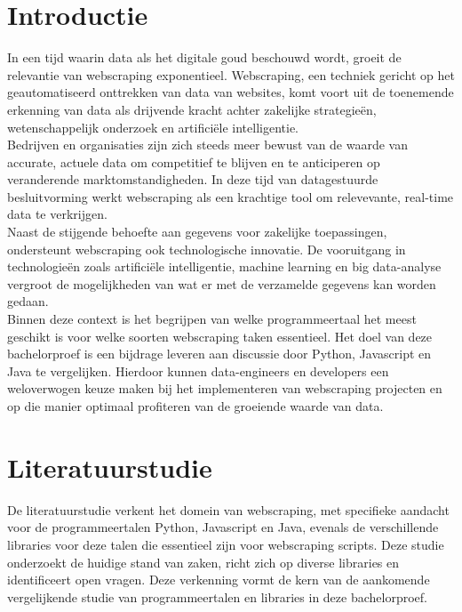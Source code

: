 
\section{Introductie}%
\label{sec:introductie}

In een tijd waarin data als het digitale goud beschouwd wordt, groeit de relevantie van webscraping exponentieel.
Webscraping, een techniek gericht op het geautomatiseerd onttrekken van data van websites, komt voort uit de toenemende 
erkenning van data als drijvende kracht achter zakelijke strategieën, wetenschappelijk onderzoek en artificiële intelligentie.
\\
Bedrijven en organisaties zijn zich steeds meer bewust van de waarde van accurate, actuele data om competitief te blijven
en te anticiperen op veranderende marktomstandigheden. In deze tijd van datagestuurde besluitvorming werkt webscraping als
een krachtige tool om relevevante, real-time data te verkrijgen.
\\
Naast de stijgende behoefte aan gegevens voor zakelijke toepassingen, ondersteunt webscraping ook technologische innovatie. 
De vooruitgang in technologieën zoals artificiële intelligentie, machine learning en big data-analyse vergroot de mogelijkheden
van wat er met de verzamelde gegevens kan worden gedaan.
\\
Binnen deze context is het begrijpen van welke programmeertaal het meest geschikt is voor welke soorten webscraping taken
essentieel. Het doel van deze bachelorproef is een bijdrage leveren aan discussie door Python, Javascript en Java te vergelijken.
Hierdoor kunnen data-engineers en developers een weloverwogen keuze maken bij het implementeren van webscraping projecten
en op die manier optimaal profiteren van de groeiende waarde van data.


\section{Literatuurstudie}
\label{sec:Literatuurstudie}

De literatuurstudie verkent het domein van webscraping, met specifieke aandacht voor de programmeertalen Python, Javascript en Java,
evenals de verschillende libraries voor deze talen die essentieel zijn voor webscraping scripts.
Deze studie onderzoekt de huidige stand van zaken, richt zich op diverse libraries en identificeert open vragen. 
Deze verkenning vormt de kern van de aankomende vergelijkende studie van programmeertalen en libraries in deze bachelorproef.


